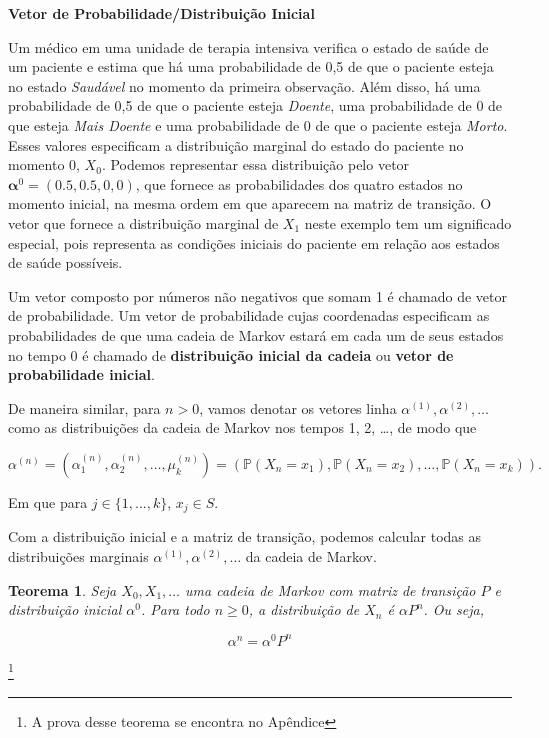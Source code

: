 \documentclass[12pt]{article}
\theoremstyle{break}
\newtheorem{theorem}{Teorema}[section]
\begin{document}
\textbf{Vetor de Probabilidade/Distribuição Inicial}





Um médico em uma unidade de terapia intensiva verifica o estado de saúde de um paciente e estima que há uma probabilidade de 0,5 de que o paciente esteja no estado \textit{Saudável} no momento da primeira observação. Além disso, há uma probabilidade de 0,5 de que o paciente esteja \textit{Doente}, uma probabilidade de 0 de que esteja \textit{Mais Doente} e uma probabilidade de 0 de que o paciente esteja \textit{Morto}. Esses valores especificam a distribuição marginal do estado do paciente no momento 0, \( X_0 \). Podemos representar essa distribuição pelo vetor \( \mathbf{\alpha}^0 = (0.5, 0.5, 0, 0) \), que fornece as probabilidades dos quatro estados no momento inicial, na mesma ordem em que aparecem na matriz de transição.
O vetor que fornece a distribuição marginal de \( X_1 \) neste exemplo tem um significado especial, pois representa as condições iniciais do paciente em relação aos estados de saúde possíveis.




Um vetor composto por números não negativos que somam 1 é chamado de vetor de probabilidade. Um vetor de probabilidade cujas coordenadas especificam as probabilidades de que uma cadeia de Markov estará em cada um de seus estados no tempo 0 é chamado de \textbf{distribuição inicial da cadeia} ou \textbf{vetor de probabilidade inicial}.


De maneira similar, para $n> 0$, vamos denotar os vetores linha \( \alpha^{(1)}, \alpha^{(2)}, \ldots \) como as distribuições da cadeia de Markov nos tempos 1, 2, \ldots, de modo que

\[
\alpha^{(n)} = \left( \alpha_1^{(n)}, \alpha_2^{(n)}, \ldots, \mu_k^{(n)} \right)
= \left( \mathbb{P}(X_n = x_1), \mathbb{P}(X_n = x_2), \ldots, \mathbb{P}(X_n = x_k) \right).
\]

Em que para $j \in \{1, ..., k\}$, $x_j \in S$. 


Com a distribuição inicial e a matriz de transição,  podemos calcular todas as distribuições marginais \( \alpha^{(1)}, \alpha^{(2)}, \ldots \) da cadeia de Markov.


\begin{theorem}
Seja \( X_0, X_1, \dots \) uma cadeia de Markov com matriz de transição \( P \) e distribuição inicial \( \alpha^0 \). Para todo \( n \geq 0 \), a distribuição de \( X_n \) é \( \alpha P^n \). Ou seja,

\[
\alpha^n= \alpha^0 P^n
\]
\end{theorem}\footnote{A prova desse teorema se encontra no Apêndice}
\end{document}
